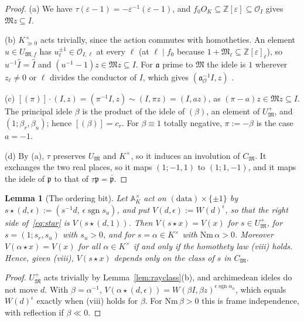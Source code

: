 \documentclass[11pt]{amsart}
\numberwithin{equation}{section}
\theoremstyle{plain}
\newtheorem{lemma}[theorem]{Lemma}
\theoremstyle{definition}
\theoremstyle{remark}
\begin{document}
\begin{proof}
(a) We have \(\tau(\varepsilon-1)=-\varepsilon^{-1}(\varepsilon-1)\), and \(f_0O_K\subseteq\mathbb Z[\varepsilon]\subseteq\mathcal O_I\) gives \(\mathfrak Mz\subseteq I\).

(b) \(K^\times_{\gg0}\) acts trivially, since the action commutes with homotheties. An element \(u\in U_{\mathfrak M,f}\) has \(u_\ell^{\pm1}\in\mathcal O_{I,\ell}\) at every \(\ell\) (at \(\ell\mid f_0\) because \(1+\mathfrak M_\ell\subseteq\mathbb Z[\varepsilon]_\ell\)), so \(u^{-1}\widehat I=\widehat I\) and \((u^{-1}-1)z\in\mathfrak Mz\subseteq I\). For \(\mathfrak a\) prime to \(\mathfrak M\) the idele is \(1\) wherever \(z_\ell\ne0\) or \(\ell\) divides the conductor of \(I\), which gives \((\mathfrak a_{\mathcal O}^{-1}I,z)\) \cite[Prop.~7.20]{Cox}.

(c) \([(\pi)]\cdot(I,z)=(\pi^{-1}I,z)\sim(I,\pi z)=(I,az)\), as \((\pi-a)z\in\mathfrak Mz\subseteq I\). The principal idele \(\beta\) is the product of the idele of \((\beta)\), an element of \(U_{\mathfrak M}^+\), and \((1;\beta_r,\beta_u)\); hence \([(\beta)]=c_r\). For \(\beta\equiv1\) totally negative, \(\pi:=-\beta\) is the case \(a=-1\).

(d) By (a), \(\tau\) preserves \(U_{\mathfrak M}\) and \(K^\times\), so it induces an involution of \(C_{\mathfrak M}\). It exchanges the two real places, so it maps \((1;-1,1)\) to \((1;1,-1)\), and it maps the idele of \(\mathfrak p\) to that of \(\tau\mathfrak p=\bar{\mathfrak p}\).
\end{proof}

\begin{lemma}[The ordering bit]\label{lem:orderbit}
Let \(\mathbb A_K^\times\) act on \((\text{data})\times\{\pm1\}\) by \(s\star(d,\epsilon):=(s^{-1}d,\,\epsilon\operatorname{sgn}s_u)\), and put \(V(d,\epsilon):=W(d)^\epsilon\), so that the right side of~\eqref{eq:star} is \(V(s\star(d,1))\). Then \(V(s\star x)=V(x)\) for \(s\in U_{\mathfrak M}^+\), for \(s=(1;s_r,s_u)\) with \(s_u>0\), and for \(s=\alpha\in K^\times\) with \(\mathrm{Nm}\,\alpha>0\). Moreover \(V(\alpha\star x)=V(x)\) for all \(\alpha\in K^\times\) if and only if the homothety law (viii) holds. Hence, given (viii), \(V(s\star x)\) depends only on the class of \(s\) in \(C_{\mathfrak M}\).
\end{lemma}

\begin{proof}
\(U^+_{\mathfrak M}\) acts trivially by Lemma~\ref{lem:rayclass}(b), and archimedean ideles do not move \(d\). With \(\beta=\alpha^{-1}\), \(V(\alpha\star(d,\epsilon))=W(\beta I,\beta z)^{\epsilon\operatorname{sgn}\alpha_u}\), which equals \(W(d)^\epsilon\) exactly when (viii) holds for \(\beta\). For \(\mathrm{Nm}\,\beta>0\) this is frame independence, with reflection if \(\beta\ll0\).
\end{proof}
\end{document}
